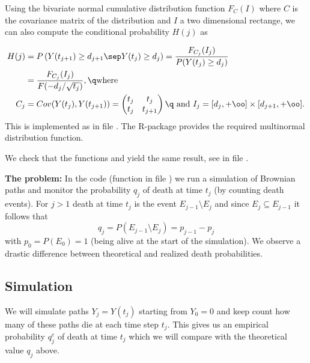 Using the bivariate normal cumulative distribution function $F_C(I)$
where $C$ is the covariance matrix of the distribution and $I$ a two dimensional 
rectange, we can also compute the conditional probability $H(j)$ as

%
\begin{align} 
\notag 
H(j) &=
P\left(Y(t_{j+1})\geq d_{j+1}\sep Y(t_j)\geq d_j\right)=
\frac{F_{C_j}(I_j)}{P(Y(t_j)\geq d_j)}
\\\label{Hj1}&=
\frac{F_{C_j}(I_j)}{F(-d_j/\sqrt{t_j})},
\q\text{where}\\
C_j&=Cov(Y(t_j),Y(t_{j+1}))=
\begin{pmatrix}
t_j & t_j\\
t_j & t_{j+1}
\end{pmatrix}
\q\text{ and }
I_j = [d_j,+\oo]\times[d_{j+1},+\oo].
\end{align}
%
This is implemented as  in file .
The R-package  provides the required multinormal distribution
function.

We check that the functions  and  yield the same 
result, see  in file .

\medskip\noindent
\textbf{The problem:}
In the code (function  in file )
we run a simulation of Brownian paths and monitor the probability $q_j$ of 
death at time $t_j$ (by counting death events). For $j>1$ death at time $t_j$
is the event $E_{j-1}\setminus E_j$ and since $E_j\subseteq E_{j-1}$ it follows
that
%
\begin{equation}
\label{qj}
q_j=P(E_{j-1}\setminus E_j) = p_{j-1}-p_j
\end{equation}
%
with $p_0=P(E_0)=1$ (being alive at the start of the simulation).
We observe a drastic difference between theoretical and realized death
probabilities.

\subsection{Simulation}

We will simulate paths $Y_j=Y(t_j)$ starting from $Y_0=0$ and keep count how
many of these paths die at each time step $t_j$. This gives us an empirical 
probability $q^e_j$ of death at time $t_j$ which we will compare with the theoretical value $q_j$ above.

